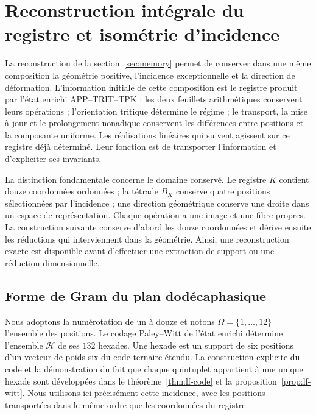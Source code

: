 \section{Reconstruction intégrale du registre et isométrie d’incidence}
\label{rev4:ki:section}

La reconstruction de la section~\ref{sec:memory} permet de conserver dans
une même composition la géométrie positive, l’incidence exceptionnelle
et la direction de déformation. L’information initiale de cette
composition est le registre produit par l’état enrichi
APP--TRIT--TPK : les deux feuillets arithmétiques conservent leurs opérations ;
l’orientation tritique détermine le régime ; le transport, la
mise à jour et le prolongement nonadique conservent les différences
entre positions et la composante uniforme. Les réalisations linéaires
qui suivent agissent sur ce registre déjà déterminé. Leur fonction est
de transporter l’information et d’expliciter ses invariants.

La distinction fondamentale concerne le domaine conservé. Le
registre \(K\) contient douze coordonnées ordonnées ; la tétrade
\(B_K\) conserve quatre positions sélectionnées par l’incidence ;
une direction géométrique conserve une droite dans un espace de
représentation. Chaque opération a une image et une fibre propres.
La construction suivante conserve d’abord les douze coordonnées et
dérive ensuite les réductions qui interviennent dans la géométrie. Ainsi,
une reconstruction exacte est disponible avant d’effectuer une
extraction de support ou une réduction dimensionnelle.

\subsection{Forme de Gram du plan dodécaphasique}
\label{rev4:ki:gram-subsection}

Nous adoptons la numérotation de un à douze et notons
\(\Omega=\{1,\ldots,12\}\) l’ensemble des positions. Le
codage Paley--Witt de l’état enrichi détermine l’ensemble
\(\mathcal H\) de ses \(132\) hexades. Une hexade est un support
de six positions d’un vecteur de poids six du code ternaire
étendu. La construction explicite du code et la démonstration du fait
que chaque quintuplet appartient à une unique hexade sont développées dans
le théorème~\ref{thm:lf-code} et la
proposition~\ref{prop:lf-witt}. Nous utilisons ici précisément cette
incidence, avec les positions transportées dans le même ordre que
les coordonnées du registre.

